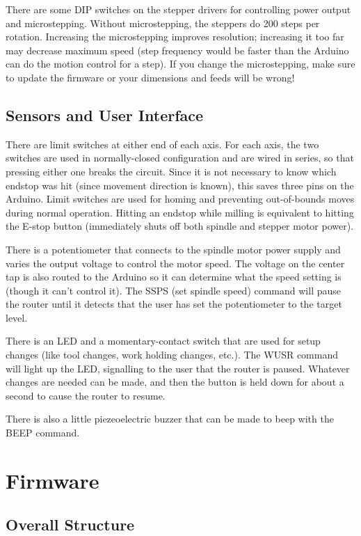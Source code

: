 \documentclass[a4paper,11pt]{article}
\begin{document}
There are some DIP switches on the stepper drivers for controlling power output and microstepping. Without microstepping, the steppers do 200 steps per rotation. Increasing the microstepping improves resolution; increasing it too far may decrease maximum speed (step frequency would be faster than the Arduino can do the motion control for a step). If you change the microstepping, make sure to update the firmware or your dimensions and feeds will be wrong!

\subsection{Sensors and User Interface}
There are limit switches at either end of each axis. For each axis, the two switches are used in normally-closed configuration and are wired in series, so that pressing either one breaks the circuit. Since it is not necessary to know which endstop was hit (since movement direction is known), this saves three pins on the Arduino. Limit switches are used for homing and preventing out-of-bounds moves during normal operation. Hitting an endstop while milling is equivalent to hitting the E-stop button (immediately shuts off both spindle and stepper motor power).

There is a potentiometer that connects to the spindle motor power supply and varies the output voltage to control the motor speed. The voltage on the center tap is also routed to the Arduino so it can determine what the speed setting is (though it can't control it). The SSPS (set spindle speed) command will pause the router until it detects that the user has set the potentiometer to the target level. 

There is an LED and a momentary-contact switch that are used for setup changes (like tool changes, work holding changes, etc.). The WUSR command will light up the LED, signalling to the user that the router is paused. Whatever changes are needed can be made, and then the button is held down for about a second to cause the router to resume.

There is also a little piezeoelectric buzzer that can be made to beep with the BEEP command. 

\section{Firmware}
\subsection{Overall Structure}
\end{document}
